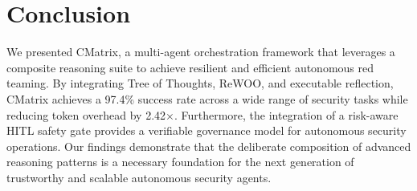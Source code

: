 \section{Conclusion}

We presented CMatrix, a multi-agent orchestration framework that leverages a composite reasoning suite to achieve resilient and efficient autonomous red teaming. By integrating Tree of Thoughts, ReWOO, and executable reflection, CMatrix achieves a 97.4\% success rate across a wide range of security tasks while reducing token overhead by 2.42$\times$. Furthermore, the integration of a risk-aware HITL safety gate provides a verifiable governance model for autonomous security operations. Our findings demonstrate that the deliberate composition of advanced reasoning patterns is a necessary foundation for the next generation of trustworthy and scalable autonomous security agents.
